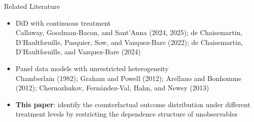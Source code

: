 \documentclass[aspectratio=1610, 9pt]{beamer}
\begin{document}
\begin{frame}{Related Literature}
   
    \begin{itemize}
        \item DiD with continuous treatment \\
         \vspace{0.1cm}
        Callaway, Goodman-Bacon, and Sant’Anna (2024, 2025); de Chaisemartin, D’Haultfœuille, Pasquier, Sow, and Vazquez-Bare (2022); de Chaisemartin, D’Haultfœuille, and Vazquez-Bare (2024)
        

    \vspace{0.25cm}
     \item Panel data models with unrestricted heterogeneity\\
         \vspace{0.1cm}
         Chamberlain (1982); Graham and Powell (2012); Arellano and Bonhomme (2012); Chernozhukov, Fernández-Val, Hahn, and Newey (2013)
        
     \vspace{0.25cm}
        \item \textbf{This paper}: identify the counterfactual outcome distribution under different treatment levels by restricting the dependence structure of unobservables
        

        
    \end{itemize}

\end{frame}
\end{document}
